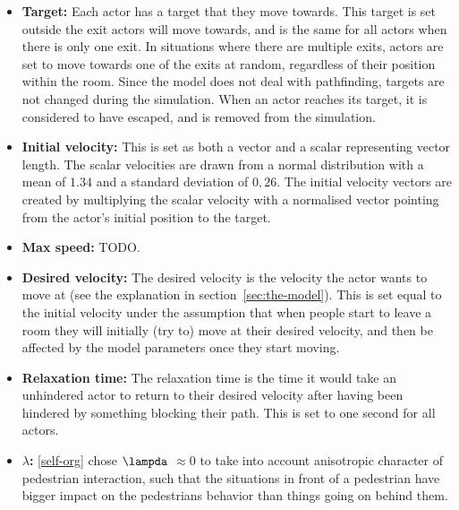 \begin{itemize}
    \item \textbf{Target:} Each actor has a target that they move towards. 
        This target is set outside the exit actors will move towards, and is 
        the same for all actors when there is only one exit. In situations 
        where there are multiple exits, actors are set to move towards one of 
        the exits at random, regardless of their position within the room. 
        Since the model does not deal with pathfinding, targets are not 
        changed during the simulation. When an actor reaches its target, it is 
        considered to have escaped, and is removed from the simulation.

    \item \textbf{Initial velocity:} This is set as both a vector and a scalar 
        representing vector length. The scalar velocities are drawn from a 
        normal distribution with a mean of $1.34$ and a standard deviation of 
        $0,26$. The initial velocity vectors are created by multiplying the 
        scalar velocity with a normalised vector pointing from the actor's 
        initial position to the target.

    \item \textbf{Max speed:} TODO.

    \item \textbf{Desired velocity:} The desired velocity is the velocity the 
        actor wants to move at (see the explanation in 
        section~\ref{sec:the-model}). This is set equal to the initial velocity 
        under the assumption that when people start to leave a room they will 
        initially (try to) move at their desired velocity, and then be 
        affected by the model parameters once they start moving.

    \item \textbf{Relaxation time:} The relaxation time is the time it would 
        take an unhindered actor to return to their desired velocity after 
        having been hindered by something blocking their path. This is set to 
        one second for all actors.

    \item \textbf{$\lambda$:} \ref{self-org} chose $\lampda$ $\approx 0$ to take into account
	anisotropic character of pedestrian interaction, such that the situations in front of
	a pedestrian have bigger impact on the pedestrians behavior than things going on
	behind them.
\end{itemize}

